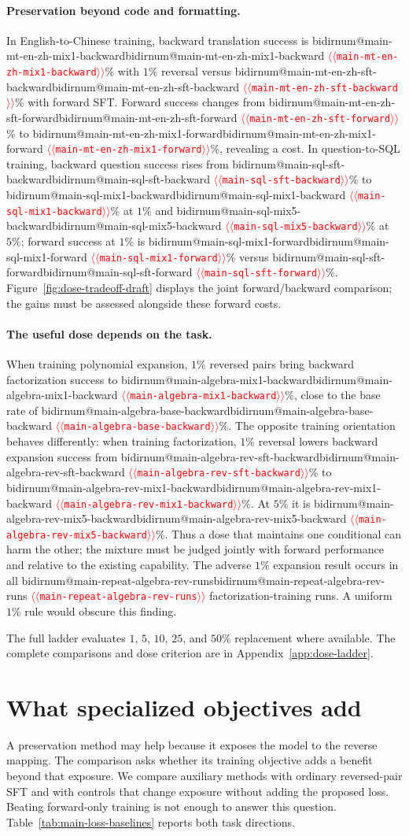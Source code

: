 \documentclass[11pt]{article}
\makeatletter
\providecommand{\NUM}[1]{%
  \ifcsname bidirnum@#1\endcsname\csname bidirnum@#1\endcsname
  \else\textcolor{red}{$\langle\langle$\texttt{#1}$\rangle\rangle$}\fi}
\makeatother
\begin{document}
\paragraph{Preservation beyond code and formatting.}
In English-to-Chinese training, backward translation success is
\NUM{main-mt-en-zh-mix1-backward}\% with $1\%$ reversal versus
\NUM{main-mt-en-zh-sft-backward}\% with forward SFT. Forward success changes from
\NUM{main-mt-en-zh-sft-forward}\% to \NUM{main-mt-en-zh-mix1-forward}\%, revealing
a cost. In question-to-SQL training, backward question success rises from
\NUM{main-sql-sft-backward}\% to \NUM{main-sql-mix1-backward}\% at $1\%$ and
\NUM{main-sql-mix5-backward}\% at $5\%$; forward success at $1\%$ is
\NUM{main-sql-mix1-forward}\% versus \NUM{main-sql-sft-forward}\%.
Figure~\ref{fig:dose-tradeoff-draft} displays the joint forward/backward comparison;
the gains must be assessed alongside these forward costs.

\paragraph{The useful dose depends on the task.}
When training polynomial expansion, $1\%$ reversed pairs bring backward factorization
success to \NUM{main-algebra-mix1-backward}\%, close to the base rate of
\NUM{main-algebra-base-backward}\%. The opposite training orientation behaves differently:
when training factorization, $1\%$ reversal lowers backward expansion success from
\NUM{main-algebra-rev-sft-backward}\% to \NUM{main-algebra-rev-mix1-backward}\%.
At $5\%$ it is \NUM{main-algebra-rev-mix5-backward}\%. Thus a dose that maintains one
conditional can harm the other; the mixture must be judged jointly with forward performance
and relative to the existing capability. The adverse $1\%$ expansion result occurs in all
\NUM{main-repeat-algebra-rev-runs} factorization-training runs. A uniform $1\%$ rule
would obscure this finding.

The full ladder evaluates $1$, $5$, $10$, $25$, and $50\%$ replacement where available.
The complete comparisons and dose criterion are in Appendix~\ref{app:dose-ladder}.

\section{What specialized objectives add}
\label{sec:attrib}

A preservation method may help because it exposes the model to the reverse mapping.
The comparison asks whether its training objective adds a benefit beyond that exposure.
We compare auxiliary
methods with ordinary reversed-pair SFT and with controls that change exposure without
adding the proposed loss. Beating forward-only training is not enough to answer this
question. Table~\ref{tab:main-loss-baselines} reports both task directions.
\end{document}

